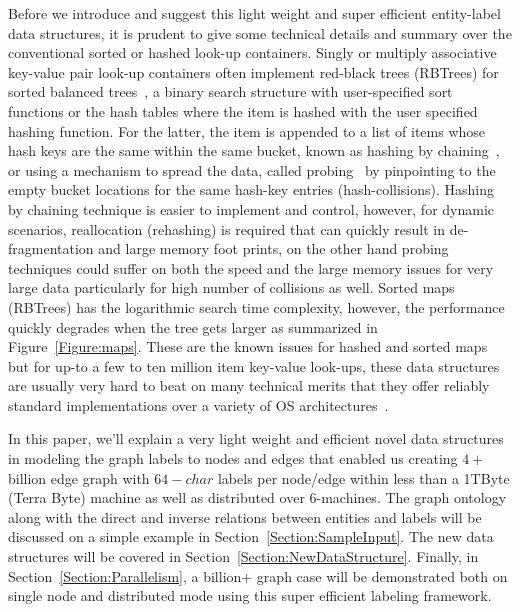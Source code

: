 \documentclass[preprint,3p,twocolumn]{elsarticle}
\begin{document}
Before we introduce and suggest this light weight and super efficient entity-label data structures, it is prudent to give some technical details and summary over the conventional sorted or hashed look-up containers. Singly or multiply associative key-value pair look-up containers often implement red-black trees (RBTrees) for sorted balanced trees~\cite{rbt,rbt2}, a binary search structure with user-specified sort functions or the hash tables where the item is hashed with the user specified hashing function. For the latter, the item is appended to a list of items whose hash keys are the same within the same bucket, known as hashing by chaining~\cite{hash,hash2}, or using a mechanism to spread the data, called probing~\cite{probing,probing2} by pinpointing to the empty bucket locations for the same hash-key entries (hash-collisions). Hashing by chaining technique is easier to implement and control, however, for dynamic scenarios, reallocation (rehashing) is required that can quickly result in de-fragmentation and large memory foot prints, on the other hand probing techniques could suffer on both the speed and the large memory issues for very large data particularly for high number of collisions as well. Sorted maps (RBTrees) has the logarithmic search time complexity, however, the performance quickly degrades when the tree gets larger as summarized in Figure~\ref{Figure:maps}. These are the known issues for hashed and sorted maps but for up-to a few to ten million item key-value look-ups, these data structures are usually very hard to beat on many technical merits that they offer reliably standard implementations over a variety of OS architectures~\cite{benchmark}. 

In this paper, we'll explain a very light weight and efficient novel data structures in modeling the graph labels to nodes and edges that enabled us creating $4+$ billion edge graph with $64-char$ labels per node/edge within less than a 1TByte (Terra Byte) machine as well as distributed over 6-machines.  The graph ontology along with the direct and inverse relations between entities and labels will be discussed on a simple example in Section~\ref{Section:SampleInput}. The new data structures will be covered in Section~\ref{Section:NewDataStructure}. Finally, in Section~\ref{Section:Parallelism}, a billion+ graph case will be demonstrated both on single node and distributed mode using this super efficient labeling framework.
\end{document}
